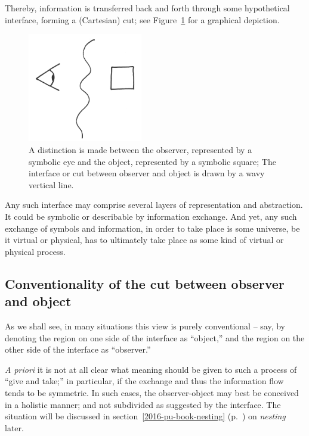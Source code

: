 Thereby, information is transferred back and forth through some hypothetical interface,
forming a
(Cartesian) cut;
see Figure~\ref{2016-pu-book-chapter-eo-figure-measurement} for a graphical depiction.
\begin{figure}
\begin{center}
\includegraphics[width=5cm,angle=10]{2016-pu-book-chapter-eo-figure-measurement}
\end{center}
\caption{
A distinction is made between the observer, represented by a symbolic eye and
 the object, represented by a symbolic square;
The interface or cut between observer and object is drawn by a wavy vertical line.
\label{2016-pu-book-chapter-eo-figure-measurement}
}
\end{figure}
Any such interface may comprise several layers of representation and abstraction.
It could be symbolic or describable by information exchange.
And yet, any such exchange of symbols and information, in order to take place is some universe,  be it virtual or physical,
has to ultimately take place as some kind of virtual or physical process.

\subsection{Conventionality of the cut between observer and object}

As we shall see, in many situations this view is purely conventional -- say, by denoting the region on one side of the interface as ``object,''
and the region on the other side of the interface as ``observer.''

{\it A priori} it is not at all clear what meaning should be given to such a process of ``give and take;''
in particular, if the exchange and thus the information flow tends to be symmetric.
In such cases, the observer-object may best be conceived in a holistic manner; and not subdivided as suggested by the interface.
The situation will be discussed in section~\ref{2016-pu-book-nesting} (p.~\pageref{2016-pu-book-nesting})
on {\em nesting}
later.


